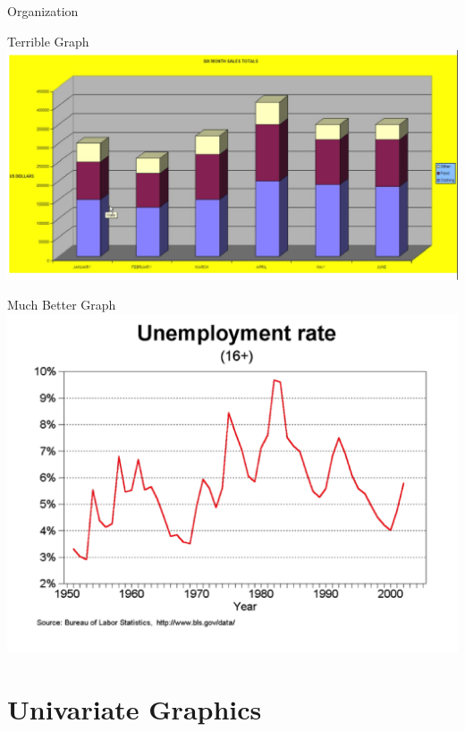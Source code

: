 \documentclass[table,smaller]{beamer}
\begin{document}
\begin{frame}[fragile,label=sec-1-2]{Organization}
\begin{block}{Terrible Graph}
\includegraphics[width=.9\linewidth]{./images/Terrible.png}
\end{block}
\begin{block}{Much Better Graph}
\includegraphics[width=.9\linewidth]{./images/Good.png}
\end{block}
\end{frame}



\section{Univariate Graphics}
\label{sec-2}
\end{document}
